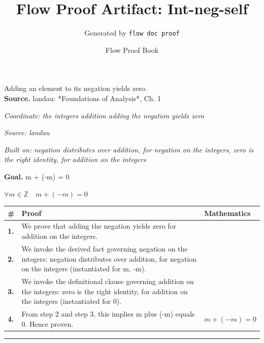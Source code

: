 \documentclass[11pt]{article}
\title{Flow Proof Artifact: Int-neg-self}
\author{Generated by \texttt{flow doc proof}}
\date{Flow Proof Book}
\theoremstyle{definition}
\begin{document}
\maketitle
Adding an element to its negation yields zero.\\[0.5em]
\textbf{Source.} landau: *Foundations of Analysis*, Ch. 1\\[0.5em]
\bigskip
{}\par
\smallskip\noindent\textit{Coordinate: the integers \cdot addition \cdot adding the negation yields zero}\par
\smallskip\noindent\textit{Source: landau}\par
\smallskip\noindent\textit{Built on: negation distributes over addition, for negation on the integers, zero is the right identity, for addition on the integers}\par
\medskip
\noindent\textbf{Goal.} m + (-m) = 0\par
\noindent$\displaystyle \forall m \in \mathbb{Z}\quad m + (-m) = 0$\par
\medskip
\noindent
\begin{tabular}{@{} >{\raggedright\arraybackslash}p{} >{\raggedright\arraybackslash}p{} >{\raggedleft\arraybackslash}p{} @{}}
\textbf{\#} & \textbf{Proof} & \textbf{Mathematics} \\
\midrule
\textbf{1.} & We prove that adding the negation yields zero for addition on the integers. & \\[0.45em]
\textbf{2.} & We invoke the derived fact governing negation on the integers: negation distributes over addition, for negation on the integers (instantiated for m, -m). & \\[0.45em]
\textbf{3.} & We invoke the definitional clause governing addition on the integers: zero is the right identity, for addition on the integers (instantiated for 0). & \\[0.45em]
\textbf{4.} & From step 2 and step 3, this implies m plus (-m) equals 0. Hence proven. & $\displaystyle m + (-m) = 0$ \\[0.45em]
\bottomrule
\end{tabular}
\label{thm:Int-addition-adding_the_negation_yields_zero}
\par\medskip\hrule
\end{document}
